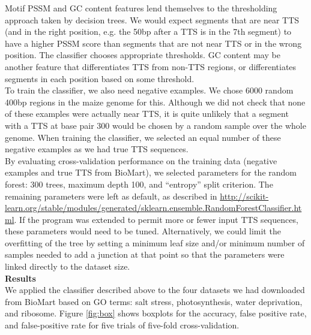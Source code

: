 \documentclass[12pt,letterpaper]{report}
\begin{document}
\indent Motif PSSM and GC content features lend themselves to the thresholding approach taken by decision trees. We would expect segments that are near TTS (and in the right position, e.g. the 50bp after a TTS is in the 7th segment) to have a higher PSSM score than segments that are not near TTS or in the wrong position. The classifier chooses appropriate thresholds. GC content may be another feature that differentiates TTS from non-TTS regions, or differentiates segments in each position based on some threshold.\\

\indent To train the classifier, we also need negative examples. We chose 6000 random 400bp regions in the maize genome for this. Although we did not check that none of these examples were actually near TTS, it is quite unlikely that a segment with a TTS at base pair 300 would be chosen by a random sample over the whole genome. When training the classifier, we selected an equal number of these negative examples as we had true TTS sequences. \\

\indent By evaluating cross-validation performance on the training data (negative examples and true TTS from BioMart), we selected parameters for the random forest: 300 trees, maximum depth 100, and ``entropy'' split criterion. The remaining parameters were left as default, as described in \url{http://scikit-learn.org/stable/modules/generated/sklearn.ensemble.RandomForestClassifier.html}. If the program was extended to permit more or fewer input TTS sequences, these parameters would need to be tuned. Alternatively, we could limit the overfitting of the tree by setting a minimum leaf size and/or minimum number of samples needed to add a junction at that point so that the parameters were linked directly to the dataset size.\\

{\Large\textbf{Results}}\\

\indent We applied the classifier described above to the four datasets we had downloaded from BioMart based on GO terms: salt stress, photosynthesis, water deprivation, and ribosome. Figure \ref{fig:box} shows boxplots for the accuracy, false positive rate, and false-positive rate for five trials of five-fold cross-validation. \\
\end{document}
